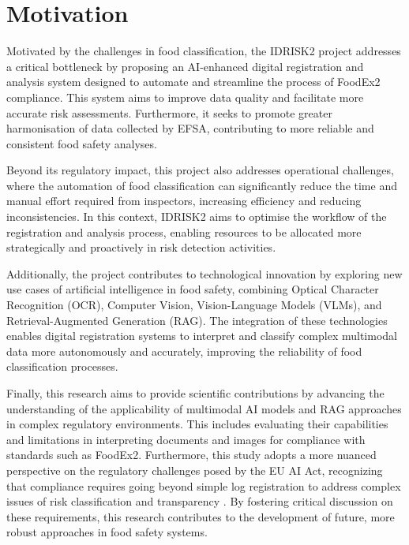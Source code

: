 \hypertarget{motivation}{%
\section{Motivation}\label{motivation}}

Motivated by the challenges in food classification, the IDRISK2 project addresses a critical bottleneck by proposing an AI-enhanced digital registration and analysis system designed to automate and streamline the process of FoodEx2 compliance. This system aims to improve data quality and facilitate more accurate risk assessments. Furthermore, it seeks to promote greater harmonisation of data collected by EFSA, contributing to more reliable and consistent food safety analyses.

Beyond its regulatory impact, this project also addresses operational challenges, where the automation of food classification can significantly reduce the time and manual effort required from inspectors, increasing efficiency and reducing inconsistencies. In this context, IDRISK2 aims to optimise the workflow of the registration and analysis process, enabling resources to be allocated more strategically and proactively in risk detection activities.

Additionally, the project contributes to technological innovation by exploring new use cases of artificial intelligence in food safety, combining Optical Character Recognition (OCR), Computer Vision, Vision-Language Models (VLMs), and Retrieval-Augmented Generation (RAG). The integration of these technologies enables digital registration systems to interpret and classify complex multimodal data more autonomously and accurately, improving the reliability of food classification processes.

Finally, this research aims to provide scientific contributions by advancing the understanding of the applicability of multimodal AI models and RAG approaches in complex regulatory environments. This includes evaluating their capabilities and limitations in interpreting documents and images for compliance with standards such as FoodEx2. Furthermore, this study adopts a more nuanced perspective on the regulatory challenges posed by the EU AI Act, recognizing that compliance requires going beyond simple log registration to address complex issues of risk classification and transparency \parencite{idse_lucien_val_e2ea81c6}. By fostering critical discussion on these requirements, this research contributes to the development of future, more robust approaches in food safety systems.

